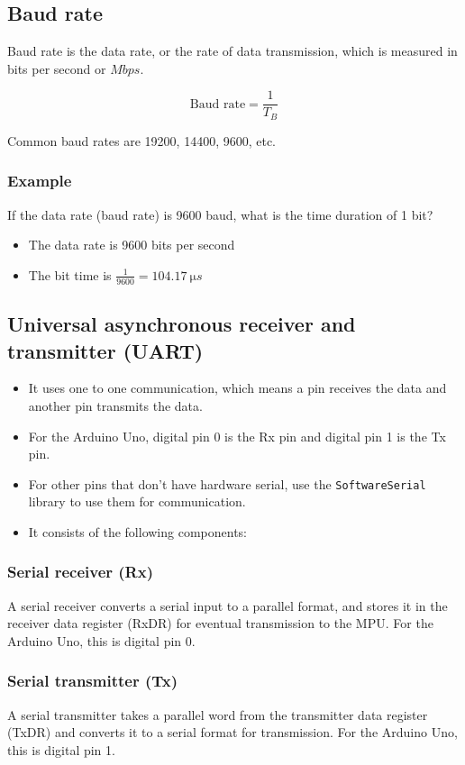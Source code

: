 \documentclass[11pt]{article}
\begin{document}
\subsection{Baud rate}
\label{sec:org37c2f86}
Baud rate is the data rate, or the rate of data transmission, which is measured in bits per second or \(\unit{Mbps}\).

\[\text{Baud rate} = \frac{1}{T_B}\]

Common baud rates are 19200, 14400, 9600, etc.

\subsubsection{Example}
\label{sec:orge4f0762}
If the data rate (baud rate) is 9600 baud, what is the time duration of 1 bit?
\begin{itemize}
\item The data rate is 9600 bits per second
\item The bit time is \(\frac{1}{9600} = \qty{104.17}{\micro s}\)
\end{itemize}

\subsection{Universal asynchronous receiver and transmitter (UART)}
\label{sec:org0eff4f0}
\begin{itemize}
\item It uses one to one communication, which means a pin receives the data and another pin transmits the data.
\item For the Arduino Uno, digital pin 0 is the Rx pin and digital pin 1 is the Tx pin.
\item For other pins that don't have hardware serial, use the \texttt{SoftwareSerial} library to use them for communication.
\item It consists of the following components:
\end{itemize}

\subsubsection{Serial receiver (Rx)}
\label{sec:org5795da4}
A serial receiver converts a serial input to a parallel format, and stores it in the receiver data register (RxDR) for eventual transmission to the MPU. For the Arduino Uno, this is digital pin 0.

\subsubsection{Serial transmitter (Tx)}
\label{sec:orgf998772}
A serial transmitter takes a parallel word from the transmitter data register (TxDR) and converts it to a serial format for transmission. For the Arduino Uno, this is digital pin 1.
\end{document}
